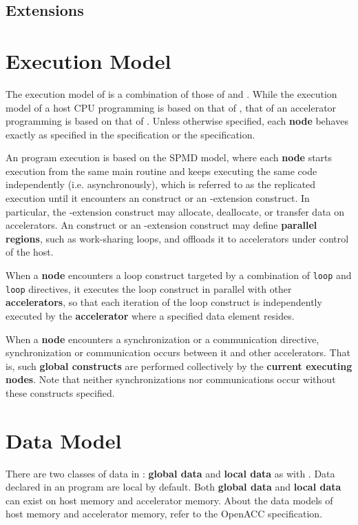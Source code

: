 \subsection{{\OACC} Extensions}

\section{Execution Model}
The execution model of {\XACC} is a combination of those of {\XMP} and {\OACC}.
While the execution model of a host CPU programming is based on that of {\XMP},
that of an accelerator programming is based on that of {\OACC}.
Unless otherwise specified,
each {\bf node} behaves exactly as specified in the {\XMP} specification\cite{xmp} or the {\OACC} specification\cite{openacc}.

An {\XACC} program execution is based on the SPMD model, 
where each {\bf node} starts execution from the same main routine and keeps executing the same code independently (i.e. asynchronously), 
which is referred to as the replicated execution
until it encounters an {\XMP} construct or an {\XMP}-extension construct.
In particular,
the {\XMP}-extension construct may allocate, deallocate, or transfer data on accelerators.
An {\OACC} construct or an {\OACC}-extension construct may define {\bf parallel regions}, such as work-sharing loops, 
and offloads it to accelerators under control of the host.

When a {\bf node} encounters a loop construct 
targeted by a combination of {\XMP} {\tt loop} and {\OACC} {\tt loop} directives,
it executes the loop construct in parallel with other {\bf accelerators},
so that each iteration of the loop construct is independently executed by the {\bf accelerator}
where a specified data element resides.

When a {\bf node} encounters a {\XACC} synchronization or a {\XACC} communication directive,
synchronization or communication occurs between it and other accelerators.
That is, such {\bf global constructs} are performed collectively by the {\bf current executing nodes}.
Note that neither synchronizations nor communications occur without these constructs specified.

\section{Data Model}
There are two classes of data in {\XACC}: {\bf global data} and {\bf local data} as with {\XMP}. 
Data declared in an {\XACC} program are local by default.
Both {\bf global data} and {\bf local data} can exist on host memory and accelerator memory.
About the data models of host memory and accelerator memory, refer to the OpenACC specification\cite{openacc}.

